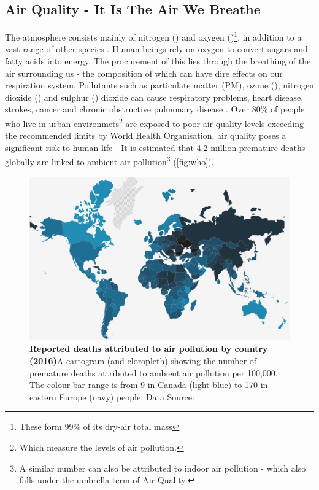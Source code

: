 \subsection{Air Quality - It Is The Air We Breathe}\label{sec:airq}
The atmosphere consists mainly of nitrogen () and oxygen ()\footnote{These form  99\% of its dry-air total mass}, in addition to a vast range of other species \citep{ac}. Human beings rely on oxygen to convert sugars and fatty acids into energy. The procurement of this lies through the breathing of the air surrounding us - the composition of which can have dire effects on our respiration system. Pollutants such as particulate matter (PM), ozone (), nitrogen dioxide () and sulphur () dioxide can cause respiratory problems, heart disease, strokes, cancer and chronic obstructive pulmonary disease \cite{who}. Over 80\% of people who live in urban environmets\footnote{Which measure the levels of air pollution.} are exposed to poor air quality levels exceeding the recommended limits by World Health Organisation, air quality poses a significant risk to human life - It is estimated that 4.2 million premature deaths globally are linked to ambient air pollution\footnote{A similar number can also be attributed to indoor air pollution - which also falls under the umbrella term of Air-Quality.} (\autoref{fig:who}).

\begin{figure}[H]
  \centering
  \includegraphics[width=\textwidth]{who.png}
  \caption{\textbf{Reported deaths attributed to air pollution by country (2016)}A cartogram (and cloropleth) showing the number of premature deaths attributed to ambient air pollution per 100,000. The colour bar range is from 9 in Canada (light blue) to 170 in eastern Europe (navy) people.  Data Source:\citep{whodata}}
  \label{fig:who}
\end{figure}
%
